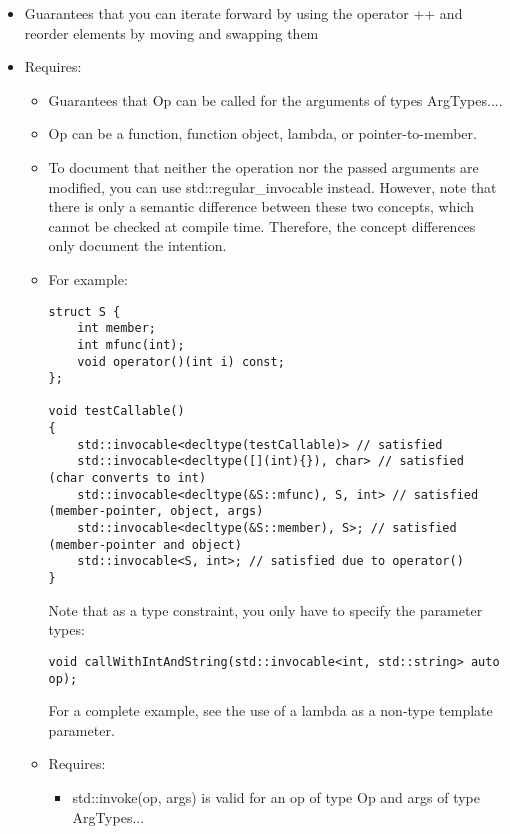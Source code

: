 \begin{itemize}
\item
Guarantees that you can iterate forward by using the operator ++ and reorder elements by moving and swapping them

\item
Requires:
\begin{itemize}
\item
Guarantees that Op can be called for the arguments of types ArgTypes....

\item
Op can be a function, function object, lambda, or pointer-to-member.

\item
To document that neither the operation nor the passed arguments are modified, you can use std::regular\_invocable instead. However, note that there is only a semantic difference between these two concepts, which cannot be checked at compile time. Therefore, the concept differences only document the intention.

\item
For example:

\begin{lstlisting}[style=styleCXX]
struct S {
	int member;
	int mfunc(int);
	void operator()(int i) const;
};

void testCallable()
{
	std::invocable<decltype(testCallable)> // satisfied
	std::invocable<decltype([](int){}), char> // satisfied (char converts to int)
	std::invocable<decltype(&S::mfunc), S, int> // satisfied (member-pointer, object, args)
	std::invocable<decltype(&S::member), S>; // satisfied (member-pointer and object)
	std::invocable<S, int>; // satisfied due to operator()
}
\end{lstlisting}

Note that as a type constraint, you only have to specify the parameter types:

\begin{lstlisting}[style=styleCXX]
void callWithIntAndString(std::invocable<int, std::string> auto op);
\end{lstlisting}

For a complete example, see the use of a lambda as a non-type template parameter.

\item
Requires:
\begin{itemize}
\item
std::invoke(op, args) is valid for an op of type Op and args of type ArgTypes...
\end{itemize}
\end{itemize}
\end{itemize}

